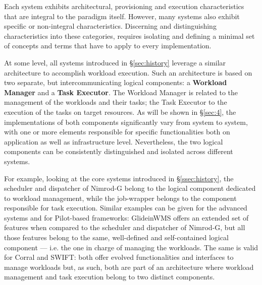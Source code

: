 \documentclass{sig-alternate}
\begin{document}
Each \pilotjob system exhibits architectural, provisioning and execution
characteristics that are integral to the \pilotjob paradigm itself.
However, many \pilotjob systems also exhibit specific or non-integral
characteristics. Discerning and distinguishing characteristics into these
categories, requires isolating and defining a minimal set of concepts and terms
that have to apply to every \pilotjob implementation.

At some level, all \pilotjob systems introduced in \S\ref{sec:history}
leverage a similar architecture to accomplish workload execution. Such
an architecture is based on two separate, but intercommunicating
logical components: a \textbf{ Workload Manager} and a \textbf{Task
  Executor}. The Workload Manager is related to the management of the
workloads and their tasks; the Task Executor to the execution of the
tasks on target resources.  As will be shown in \S\ref{sec:4}, the
implementations of both components significantly vary from system to
system, with one or more elements responsible for specific
functionalities both on application as well as infrastructure
level. Nevertheless, the two logical components can be consistently
distinguished and isolated across different \pilotjob systems.

For example, looking at the core \pilotjob systems introduced in
\S\ref{ssec:history}, the scheduler and dispatcher of Nimrod-G
 belong to the logical component
dedicated to workload management, while the job-wrapper belongs to the
component responsible for task execution. Similar examples can be
given for the advanced \pilotjob systems and for Pilot-based
frameworks: GlideinWMS 
offers an extended set of features when compared to the scheduler and
dispatcher of Nimrod-G, but all those features belong to the same,
well-defined and self-contained logical component --- i.e. the one in
charge of managing the workloads. The same is valid for Corral and
 SWIFT:
both offer evolved functionalities and interfaces to manage workloads
but, as such, both are part of an architecture where workload
management and task execution belong to two distinct
components. 
\end{document}
